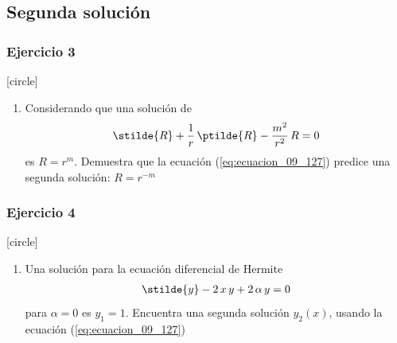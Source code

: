 \subsection{Segunda solución}
\begin{frame}
\frametitle{Ejercicio 3}
[circle]
\begin{enumerate}
\conti
\item Considerando que una solución de
\begin{align*}
\stilde{R} + \dfrac{1}{r} \, \ptilde{R} - \dfrac{m^{2}}{r^{2}} \, R = 0
\end{align*}
es $R = r^{m}$. Demuestra que la ecuación (\ref{eq:ecuacion_09_127}) predice una segunda solución: $R = r^{-m}$
\seti
\end{enumerate}
\end{frame}
\begin{frame}
\frametitle{Ejercicio 4}
[circle]
\begin{enumerate}
\conti
\item Una solución para la ecuación diferencial de Hermite
\begin{align*}
\stilde{y} - 2 \, x \, y + 2 \, \alpha \, y = 0
\end{align*}
para $\alpha = 0$ es $y_{1} = 1$. Encuentra una segunda solución $y_{2}(x)$, usando la ecuación (\ref{eq:ecuacion_09_127})
\end{enumerate}
\end{frame}

